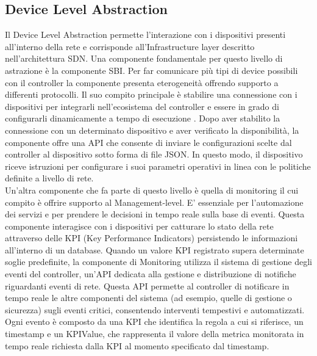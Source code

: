 \subsection{Device Level Abstraction}
Il Device Level Abstraction permette l'interazione con i dispositivi presenti all'interno della rete e corrisponde all'Infrastructure layer descritto nell'architettura SDN.
Una componente fondamentale per questo livello di astrazione è la componente SBI.
Per far comunicare più tipi di device possibili con il controller la componente presenta eterogeneità offrendo supporto a differenti protocolli.
Il suo compito principale è stabilire una connessione con i dispositivi per integrarli nell'ecosistema del controller
e essere in grado di configurarli dinamicamente a tempo di esecuzione \cite{D32}. 
Dopo aver stabilito la connessione con un determinato dispositivo e aver verificato la disponibilità,
la componente offre una API che consente di inviare le configurazioni scelte dal controller al dispositivo sotto forma di file JSON.
In questo modo, il dispositivo riceve istruzioni per configurare i suoi parametri operativi in linea con le politiche definite a livello di rete. 
\\Un'altra componente che fa parte di questo livello è quella di monitoring il cui compito è offrire supporto al Management-level.
E' essenziale per l'automazione dei servizi e per prendere le decisioni in tempo reale sulla base di eventi.
Questa componente interagisce con i dispositivi per catturare lo stato della rete attraverso delle KPI (Key Performance Indicators) persistendo le informazioni all'interno di un database. %
Quando un valore KPI registrato supera determinate soglie predefinite, la componente di Monitoring utilizza il sistema di gestione degli eventi del controller, un'API dedicata alla gestione e distribuzione di notifiche riguardanti eventi di rete.
Questa API permette al controller di notificare in tempo reale le altre componenti del sistema (ad esempio, quelle di gestione o sicurezza) sugli eventi critici, consentendo interventi tempestivi e automatizzati.
Ogni evento è composto da una KPI che identifica la regola a cui si riferisce, un timestamp e un KPIValue, che rappresenta il valore della metrica monitorata in tempo reale richiesta dalla KPI al momento specificato dal timestamp.

